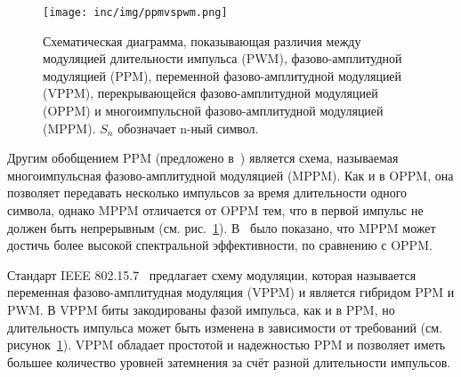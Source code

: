 \begin{figure}[!ht]
    \centering
    \texttt{[image: inc/img/ppmvspwm.png]}
    \caption{Схематическая диаграмма, показывающая различия между модуляцией длительности импульса (PWM), фазово-амплитудной модуляцией (PPM), переменной фазово-амплитудной модуляцией (VPPM), перекрывающейся фазово-амплитудной модуляцией (OPPM) и многоимпульсной фазово-амплитудной модуляцией (MPPM). $S_n$ обозначает n-ный символ.~\cite{Pathak2015}}
    \label{fig:ppmvspwm}
\end{figure}

Другим обобщением PPM (предложено в~\cite{Sugiyama1989}) является схема, называемая многоимпульсная фазово-амплитудной модуляцией (MPPM). Как и в OPPM, она позволяет передавать несколько импульсов за время длительности одного символа, однако MPPM отличается от OPPM тем, что в первой импульс не должен быть непрерывным (см. рис.~\ref{fig:ppmvspwm}). В~\cite{Shiu1999} было показано, что MPPM может достичь более высокой спектральной эффективности, по сравнению с OPPM.


Стандарт IEEE 802.15.7~\cite{IEEE2018} предлагает схему модуляции, которая называется переменная фазово-амплитудная модуляция (VPPM) и является гибридом PPM и PWM. В VPPM биты закодированы фазой импульса, как и в PPM, но длительность импульса может быть изменена в зависимости от требований (см. рисунок~\ref{fig:ppmvspwm}). VPPM обладает простотой и надежностью PPM и позволяет иметь большее количество уровней затемнения за счёт разной длительности импульсов.
